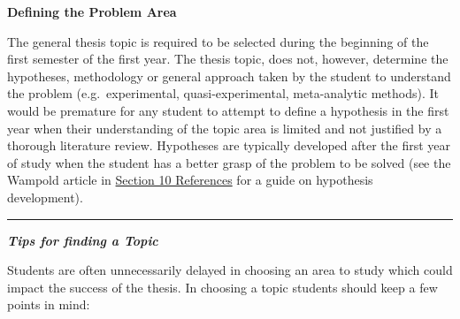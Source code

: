 \documentclass[
  openany]{book}
\begin{document}
\textbf{Defining the Problem Area}

The general thesis topic is required to be selected during the beginning of the first semester of the first year. The thesis topic, does not, however, determine the hypotheses, methodology or general approach taken by the student to understand the problem (e.g.~experimental, quasi-experimental, meta-analytic methods). It would be premature for any student to attempt to define a hypothesis in the first year when their understanding of the topic area is limited and not justified by a thorough literature review. Hypotheses are typically developed after the first year of study when the student has a better grasp of the problem to be solved (see the Wampold article in \protect\hyperlink{resources}{Section 10 References} for a guide on hypothesis development).

\begin{center}\rule{0.5\linewidth}{0.5pt}\end{center}

\textbf{\emph{Tips for finding a Topic}}

Students are often unnecessarily delayed in choosing an area to study which could impact the success of the thesis. In choosing a topic students should keep a few points in mind:
\end{document}
